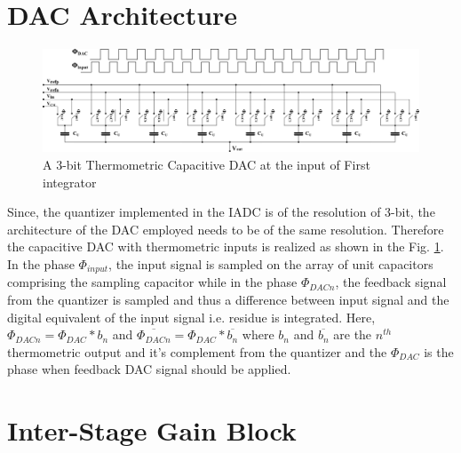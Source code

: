 \section{DAC Architecture}
\begin{figure}[h]
\centering
\includegraphics[width=\columnwidth]{Chap05/Figures/dac.png}
\caption{A 3-bit Thermometric Capacitive DAC at the input of First integrator}
\label{DAC}
\end{figure}
Since, the quantizer implemented in the IADC is of the resolution of 3-bit, the architecture of the DAC employed needs to be of the same resolution. Therefore the capacitive DAC with thermometric inputs is realized as shown in the Fig. \ref{DAC}. In the phase $\Phi_{input}$, the input signal is sampled on the array of unit capacitors comprising the sampling capacitor while in the phase $\Phi_{DACn}$, the feedback signal from the quantizer is sampled and thus a difference between input signal and the digital equivalent of the input signal i.e. residue is integrated.
Here, $\Phi_{DACn} = \Phi_{DAC}*b_n$ and $\overline{\Phi_{DACn}} = \Phi_{DAC}*\overline{b_n}$ where $b_n$ and $\overline{b_n}$ are the $n^{th}$ thermometric output and it's complement from the quantizer and the $\Phi_{DAC}$ is the phase when feedback DAC signal should be applied. 


\section{Inter-Stage Gain Block}


